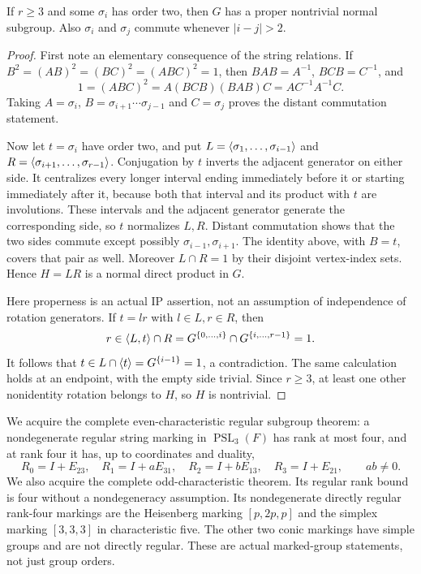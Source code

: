 \documentclass[11pt]{article}
\newcommand{\PSL}{\operatorname{PSL}}\newcommand{\PSU}{\operatorname{PSU}}
\begin{document}
\begin{lemma}\label{two}
If $r\ge3$ and some $\sigma_i$ has order two, then $G$ has a proper
nontrivial normal subgroup. Also $\sigma_i$ and $\sigma_j$ commute
whenever $|i-j|>2$.
\end{lemma}
\begin{proof}
First note an elementary consequence of the string relations. If
$B^2=(AB)^2=(BC)^2=(ABC)^2=1$, then
$BAB=A^{-1}$, $BCB=C^{-1}$, and
\[
 1=(ABC)^2=A(BCB)(BAB)C=AC^{-1}A^{-1}C.
\]
Taking $A=\sigma_i$, $B=\sigma_{i+1}\cdots\sigma_{j-1}$ and
$C=\sigma_j$ proves the distant commutation statement.

Now let $t=\sigma_i$ have order two, and put
$L=\langle\sigma_1,\ldots,\sigma_{i-1}\rangle$ and
$R=\langle\sigma_{i+1},\ldots,\sigma_{r-1}\rangle$.
Conjugation by $t$ inverts the adjacent generator on either side.
It centralizes every longer interval ending immediately before it or
starting immediately after it, because both that interval and its
product with $t$ are involutions. These intervals and the adjacent
generator generate the corresponding side, so $t$ normalizes $L,R$.
Distant commutation shows that the two sides commute except possibly
$\sigma_{i-1},\sigma_{i+1}$. The identity above, with $B=t$, covers
that pair as well. Moreover $L\cap R=1$ by their disjoint vertex-index
sets. Hence $H=LR$ is a normal direct product in $G$.

Here properness is an actual IP assertion, not an assumption of
independence of rotation generators. If $t=lr$ with $l\in L,r\in R$,
then
\[
 r\in\langle L,t\rangle\cap R
 =G^{\{0,\ldots,i\}}\cap G^{\{i,\ldots,r-1\}}=1.
\]
It follows that $t\in L\cap\langle t\rangle=G^{\{i-1\}}=1$, a
contradiction. The same calculation holds at an endpoint, with the
empty side trivial. Since $r\ge3$, at least one other nonidentity
rotation belongs to $H$, so $H$ is nontrivial.
\end{proof}

We acquire the complete even-characteristic regular subgroup theorem:
a nondegenerate regular string marking in $\PSL_3(F)$ has rank at
most four, and at rank four it has, up to coordinates and duality,
\[
 R_0=I+E_{23},\quad R_1=I+aE_{31},\quad
 R_2=I+bE_{13},\quad R_3=I+E_{21},\qquad ab\ne0.       \tag{1}
\]
We also acquire the complete odd-characteristic theorem. Its regular
rank bound is four without a nondegeneracy assumption. Its nondegenerate
directly regular rank-four markings are the Heisenberg marking
$[p,2p,p]$ and the simplex marking $[3,3,3]$ in characteristic five.
The other two conic markings have simple groups and are not directly
regular. These are actual marked-group statements, not just group orders.
\end{document}
